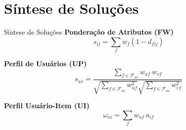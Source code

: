 \section[Síntese de Soluções]{Síntese de Soluções}
\begin{frame}{Síntese de Soluções}
\textbf{Ponderação de Atributos (FW)}
$$
    s_{ij} = \sum_{f}{w_{f} \left(1-d_{fij}\right)}
$$

\textbf{Perfil de Usuários (UP)}
$$
    s_{uv} = \frac{\sum\limits_{f \in \mathcal{F}_{uv}}{w_{uf}~w_{vf}}}{\sqrt{\sum\limits_{f \in \mathcal{F}_{uv}
    }w_{uf}^2} \sqrt{\sum\limits_{f \in \mathcal{F}_{uv}}w_{vf}^2}} 
$$

\textbf{Perfil Usuário-Item (UI)}
$$
    \omega_{ui} = \sum_{f}{w_{uf}~a_{if}}
$$

\end{frame}




